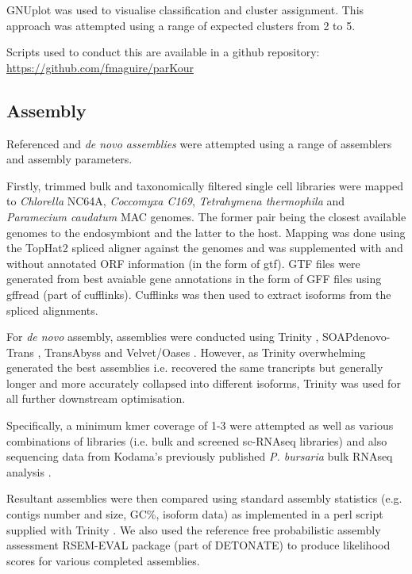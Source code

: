 GNUplot \citep{Gnuplot_4.4} was used to visualise classification and cluster assignment.
This approach was attempted using a range of expected clusters from 2 to 5.

Scripts used to conduct this are available in a github repository:
\url{https://github.com/fmaguire/parKour}



\subsection{Assembly}

Referenced and \textit{de novo assemblies} were attempted using a range of assemblers
and assembly parameters.

Firstly, trimmed bulk and taxonomically filtered single cell libraries
were mapped to \textit{Chlorella} NC64A, \textit{Coccomyxa C169}, 
\textit{Tetrahymena thermophila} and \textit{Paramecium caudatum} MAC genomes.
The former pair being the closest available genomes to the endosymbiont and the latter to the host.
Mapping was done using the TopHat2 spliced aligner \citep{Kim2013} against
the genomes and was supplemented with and without annotated ORF information (in the form of gtf).
GTF files were generated from best avaiable gene annotations in the form of GFF files using gffread (part of
cufflinks).
Cufflinks \citep{Trapnell2011} was then used to extract isoforms from the spliced alignments.

For \textit{de novo} assembly, assemblies were conducted using Trinity \citep{Grabherr2011}, 
SOAPdenovo-Trans \citep{Xie2014}, TransAbyss \citep{Robertson2010} and Velvet/Oases \citep{Schulz2012}.
However, as Trinity overwhelming generated the best assemblies i.e. recovered the same trancripts
but generally longer and more accurately collapsed into different isoforms, Trinity was 
used for all further downstream optimisation.

Specifically, a minimum kmer coverage of 1-3 were attempted as well as various
combinations of libraries (i.e. bulk and screened sc-RNAseq libraries) and also
sequencing data from Kodama's previously published \textit{P. bursaria} bulk
RNAseq analysis \citep{Kodama2014c}.

Resultant assemblies were then compared using standard assembly statistics 
(e.g. contigs number and size, GC\%, isoform data) as implemented in a perl script supplied with 
Trinity \citep{Haas2013}.  We also used the reference
free probabilistic assembly assessment RSEM-EVAL package (part of DETONATE) \citep{Li2014} to
produce likelihood scores for various completed assemblies.


